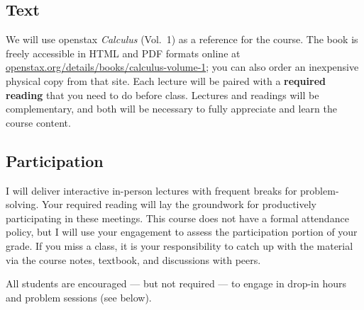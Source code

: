 \documentclass[11pt,twoside]{amsart}
\begin{document}
\subsection*{Text}
We will use openstax \emph{Calculus} (Vol.~1) as a reference for the course.  The book is freely accessible in HTML and PDF formats online at \href{https://openstax.org/details/books/calculus-volume-1}{openstax.org/details/books/calculus-volume-1}; you can also order an inexpensive physical copy from that site.  Each lecture will be paired with a \textbf{required reading} that you need to do before class.  Lectures and readings will be complementary, and both will be necessary to fully appreciate and learn the course content.

\subsection*{Participation}
I will deliver interactive in-person lectures with frequent breaks for problem-solving. Your required reading will lay the groundwork for productively participating in these meetings. This course does not have a formal attendance policy, but I will use your engagement to assess the participation portion of your grade. If you miss a class, it is your responsibility to catch up with the material via the course notes, textbook, and discussions with peers.

All students are encouraged --- but not required --- to engage in drop-in hours and problem sessions (see below).
\end{document}
